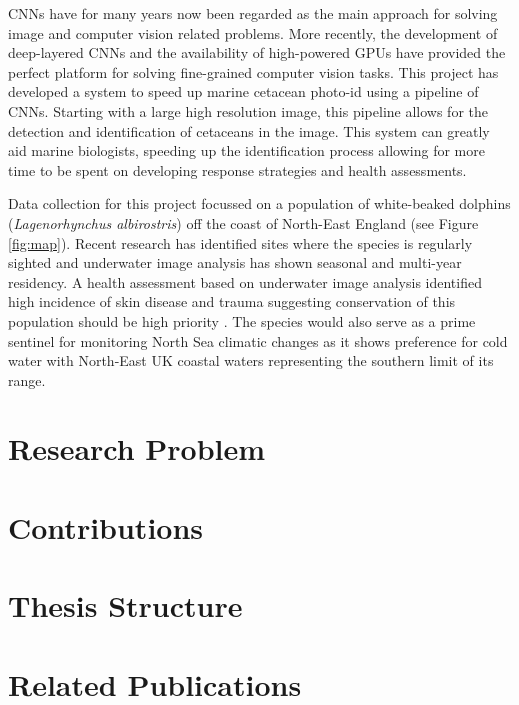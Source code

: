 CNNs have for many years now been regarded as the main approach for solving image and computer vision related problems. More recently, the development of deep-layered CNNs and the availability of  high-powered GPUs have provided the perfect platform for solving fine-grained computer vision tasks. This project has developed a system to speed up marine cetacean photo-id using a pipeline of CNNs. Starting with a large high resolution image, this pipeline allows for the detection and identification of cetaceans in the image. This system can greatly aid marine biologists, speeding up the identification process allowing for more time to be spent on developing response strategies and health assessments. 

Data collection for this project focussed on a population of white-beaked dolphins (\textit{Lagenorhynchus albirostris}) off the coast of North-East England (see Figure \ref{fig:map}). Recent research has identified sites where the species is regularly sighted \cite{galatius_lagenorhynchus_2016, hammond_cetacean_nodate} and underwater image analysis has shown seasonal and multi-year residency. A health assessment based on underwater image analysis identified high incidence of skin disease and trauma suggesting conservation of this population should be high priority \cite{van_bressem_visual_2018}. The species would also serve as a prime sentinel for monitoring North Sea climatic changes as it shows preference for cold water with North-East UK coastal waters representing the southern limit of its range.

\section{Research Problem}

\section{Contributions}

\section{Thesis Structure}

\section{Related Publications}



